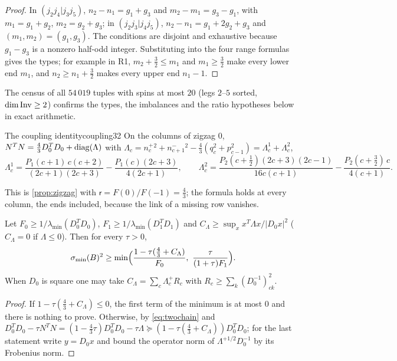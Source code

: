 \begin{proof}
In $(j_2j_4|j_3j_5)$, $n_2-n_1=g_1+g_3$ and $m_2-m_1=g_3-g_1$, with $m_1=g_1+g_2$,
$m_2=g_2+g_3$; in $(j_2j_3|j_4j_5)$, $n_2-n_1=g_1+2g_2+g_3$ and $(m_1,m_2)=(g_1,g_3)$. The
conditions are disjoint and exhaustive because $g_1-g_3$ is a nonzero half-odd integer.
Substituting into the four range formulas gives the types; for example in R1,
$m_2+\frac32\le m_1$ and $m_1\ge\frac32$ make every lower end $m_1$, and $n_2\ge n_1+\frac32$
makes every upper end $n_1-1$.
\end{proof}

The census of all $54\,019$ tuples with spins at most $20$ (legs $2$--$5$ sorted,
$\dim\operatorname{Inv}\ge2$) confirms the types, the
imbalances and the ratio hypotheses below in exact arithmetic.

\begin{proposition}{The coupling identity}{coupling32}
On the columns of zigzag $0$, $N^TN=\frac43D_0^TD_0+\operatorname{diag}(\Lambda)$ with
$\Lambda_c=n^+_c{}^2+n^-_{c+1}{}^2-\frac43(q_c^2+p_{c-1}^2)=\Lambda^1_c+\Lambda^2_c$,
\[
  \Lambda^1_c=\frac{P_1(c+1)\,c(c+2)}{(2c+1)(2c+3)}-\frac{P_1(c)(2c+3)}{4(2c+1)},\qquad
  \Lambda^2_c=\frac{P_2(c+\frac12)(2c+3)(2c-1)}{16c(c+1)}-\frac{P_2(c+\frac32)\,c}{4(c+1)} .
\]
\end{proposition}

This is \cref{prop:zigzag} with $\mathsf r=F(0)/F(-1)=\frac43$; the formula holds at every
column, the ends included, because the link of a missing row vanishes.

\begin{corollary}\label{cor:FW}
Let $F_0\ge1/\lambda_{\min}(D_0^TD_0)$, $F_1\ge1/\lambda_{\min}(D_1^TD_1)$ and
$C_\Lambda \ge\sup_xx^T\Lambda x/|D_0x|^2$ ($C_\Lambda =0$ if $\Lambda\le0$). Then for every $\tau>0$,
\[
  \smin(B)^2\ge\min\Bigl(\frac{1-\tau(\frac43+C_\Lambda)}{F_0},\ \frac{\tau}{(1+\tau)F_1}\Bigr).
\]
When $D_0$ is square one may take $C_\Lambda =\sum_c\Lambda_c^+R_c$ with $R_c\ge\sum_k(D_0^{-1})_{ck}^2$.
\end{corollary}

\begin{proof}
If $1-\tau(\frac43+C_\Lambda)\le0$, the first term of the minimum is at most $0$ and there is
nothing to prove. Otherwise, by \eqref{eq:twochain} and $D_0^TD_0-\tau N^TN=(1-\frac43\tau)D_0^TD_0-\tau\Lambda\succeq
(1-\tau(\frac43+C_\Lambda))D_0^TD_0$; for the last statement write $y=D_0x$ and bound the operator
norm of $\Lambda^{+1/2}D_0^{-1}$ by its Frobenius norm.
\end{proof}


